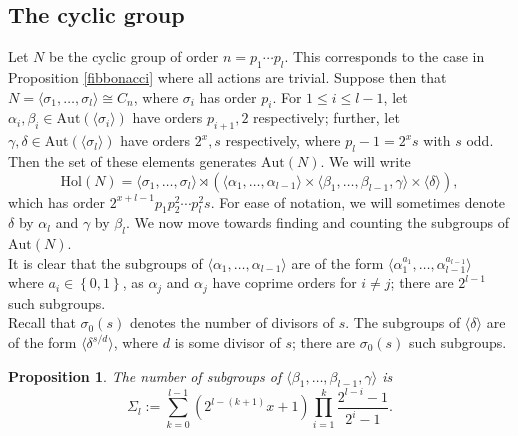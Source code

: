 \documentclass[a4paper,reqno]{amsart}
\newtheorem{proposition}[theorem]{Proposition}
\theoremstyle{definition}
\newcommand{\Aut}{\mathrm{Aut}}
\begin{document}
\subsection{The cyclic group}\label{cyclic_cunningham}
Let $N$ be the cyclic group of order $n=p_1\cdots p_l$. This corresponds to the case in Proposition \ref{fibbonacci} where all actions are trivial. Suppose then that $N=\langle \sigma_1,\ldots,\sigma_l \rangle\cong C_n$, where $\sigma_i$ has order $p_i$. For $1 \leq i \leq l-1$, let $\alpha_i,\beta_i \in \Aut(\langle \sigma_i \rangle)$ have orders $p_{i+1},2$ respectively; further, let $\gamma,\delta \in \Aut(\langle \sigma_l \rangle)$ have orders $2^x,s$ respectively, where $p_l-1=2^xs$ with $s$ odd. Then the set of these elements generates $\Aut(N)$. We will write
\[\text{Hol}(N)=\langle \sigma_1,\ldots,\sigma_{l} \rangle \rtimes \left(\langle \alpha_1,\ldots,\alpha_{l-1}\rangle \times \langle \beta_1,\ldots,\beta_{l-1},\gamma \rangle \times \langle \delta \rangle \right),\]
which has order $2^{x+l-1}p_1p_2^2\cdots p_l^2s$. For ease of notation, we will sometimes denote $\delta$ by $\alpha_l$ and $\gamma$ by $\beta_l$. We now move towards finding and counting the subgroups of $\Aut(N)$.\\
It is clear that the subgroups of $\langle \alpha_1,\ldots,\alpha_{l-1} \rangle$ are of the form $\langle \alpha_1^{a_1},\ldots,\alpha_{l-1}^{a_{l-1}} \rangle$ where $a_i \in \left\{0,1\right\}$, as $\alpha_j$ and $\alpha_j$ have coprime orders for $i \neq j$; there are $2^{l-1}$ such subgroups.\\
Recall that $\sigma_0(s)$ denotes the number of divisors of $s$. The subgroups of $\langle \delta \rangle$ are of the form $\langle \delta^{s/d} \rangle$, where $d$ is some divisor of $s$; there are $\sigma_0(s)$ such subgroups.
\begin{proposition}\label{2-subgroups}
The number of subgroups of $\langle \beta_1,\ldots,\beta_{l-1},\gamma\rangle$ is
\[\Sigma_l:=\sum_{k=0}^{l-1}(2^{l-(k+1)}x+1)\prod_{i=1}^k\frac{2^{l-i}-1}{2^i-1}.\]
\end{proposition}
\end{document}
